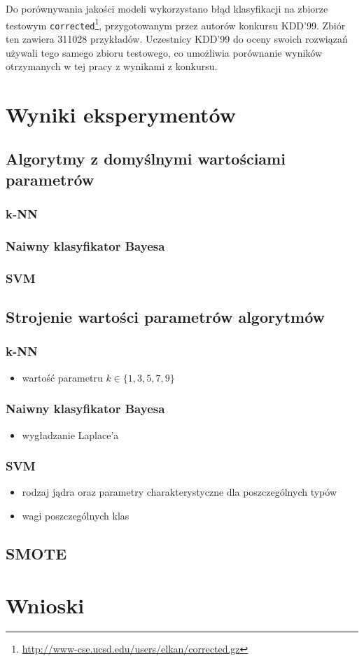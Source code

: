 \documentclass[a4paper, 12pt]{article}
\begin{document}
Do porównywania jakości modeli wykorzystano błąd klasyfikacji na zbiorze testowym 
\texttt{corrected}\footnote{\url{http://www-cse.ucsd.edu/users/elkan/corrected.gz}},
przygotowanym przez autorów konkursu KDD'99.
Zbiór ten zawiera 311028 przykładów. 
Uczestnicy KDD'99 do oceny swoich rozwiązań używali tego samego zbioru testowego,
co umożliwia porównanie wyników otrzymanych w tej pracy z wynikami z konkursu.

\section{Wyniki eksperymentów}

\subsection{Algorytmy z domyślnymi wartościami parametrów}

\subsubsection{k-NN}

\subsubsection{Naiwny klasyfikator Bayesa}

\subsubsection{SVM}

\subsection{Strojenie wartości parametrów algorytmów}



\subsubsection{k-NN}
\begin{itemize}
	\item wartość parametru $k \in \{1, 3, 5, 7, 9\}$
\end{itemize}

\subsubsection{Naiwny klasyfikator Bayesa}
\begin{itemize}
	\item wygładzanie Laplace'a
\end{itemize}

\subsubsection{SVM}
\begin{itemize}
 \item rodzaj jądra oraz parametry charakterystyczne dla poszczególnych typów
 \item wagi poszczególnych klas
\end{itemize}

\subsection{SMOTE}

\section{Wnioski}
\end{document}
